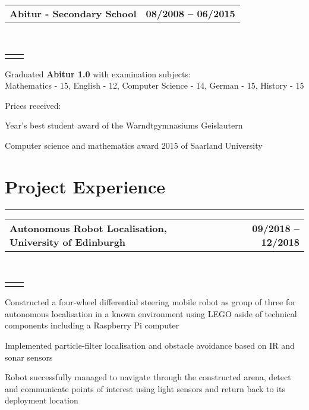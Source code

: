 \documentclass[]{deedy-resume}
\makeatletter
\newcommand{\headerrow}[2]
{\begin{tabular*}{\linewidth}{l@{\extracolsep{\fill}}r}
	\fontspec{Helvetica}\fontsize{12pt}{12pt}\selectfont\bfseries{\color{subheadings}#1} &
	\fontspec{Helvetica}\fontsize{12pt}{12pt}\selectfont\bfseries{\color{subheadings}#2} \\
\end{tabular*}}
\newcommand{\locationrow}[2]
{\begin{tabular*}{\linewidth}{l@{\extracolsep{\fill}}r}
        \color{headings}\scshape\fontspec{Heiti TC Medium}\fontsize{10pt}{12pt}\selectfont{#1}  &
        \color{headings}\scshape\fontspec{Heiti TC Medium}\fontsize{10pt}{12pt}\selectfont{#2}  \\
\end{tabular*}}
\makeatother
\begin{document}
\noindent
\headerrow{Abitur - Secondary School}{08/2008 -- 06/2015}
\\
\locationrow{Warndtgymnasium Geislautern, Völklingen}{Geislautern, Germany}
\begin{tightitemize}{1.7em}
	\item Graduated \textbf{Abitur 1.0} with examination subjects:\\
       Mathematics - 15, English - 12, Computer Science - 14, German - 15, History - 15
    \item Prices received:
    \begin{tightitemize}{0.5em}
        \item Year's best student award of the Warndtgymnasiums Geislautern
        \item Computer science and mathematics award 2015 of Saarland University
    \end{tightitemize}
\end{tightitemize}
\largesectionsep


\section*{Project Experience}
\hrule
\vspace{0.4em}

\noindent
\headerrow{Autonomous Robot Localisation, University of Edinburgh}{09/2018 -- 12/2018}
\\
\locationrow{Group Project for Robotics: Science and Systems Lecture}{}
\begin{tightitemize}{1.7em}
    \item Constructed a four-wheel differential steering mobile robot as group of three for autonomous localisation in a 
    known environment using LEGO aside of technical components including a Raspberry Pi computer
    \item Implemented particle-filter localisation and obstacle avoidance based on IR and sonar sensors
    \item Robot successfully managed to navigate through the constructed arena, detect and communicate points of
    interest using light sensors and return back to its deployment location
\end{tightitemize}
\largesectionsep
\end{document}
